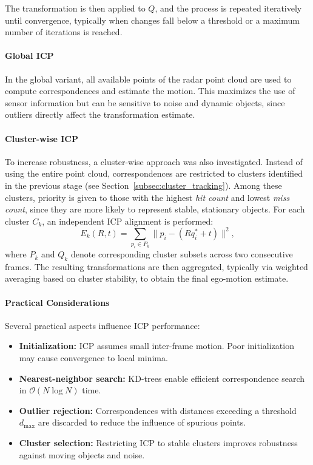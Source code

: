 The transformation is then applied to $Q$, and the process is repeated iteratively until convergence, typically when changes fall below a threshold or a maximum number of iterations is reached.

\paragraph{Global ICP}
In the global variant, all available points of the radar point cloud are used to compute correspondences and estimate the motion. 
This maximizes the use of sensor information but can be sensitive to noise and dynamic objects, since outliers directly affect the transformation estimate.

\paragraph{Cluster-wise ICP}
To increase robustness, a cluster-wise approach was also investigated. 
Instead of using the entire point cloud, correspondences are restricted to clusters identified in the previous stage (see Section~\ref{subsec:cluster_tracking}). 
Among these clusters, priority is given to those with the highest \emph{hit count} and lowest \emph{miss count}, since they are more likely to represent stable, stationary objects. 
For each cluster $C_k$, an independent ICP alignment is performed:
\begin{equation}
    E_k(R,t) = \sum_{p_i \in P_k} \lVert p_i - (R q^*_i + t) \rVert^2,
\end{equation}
where $P_k$ and $Q_k$ denote corresponding cluster subsets across two consecutive frames.
The resulting transformations are then aggregated, typically via weighted averaging based on cluster stability, to obtain the final ego-motion estimate.

\paragraph{Practical Considerations}
Several practical aspects influence ICP performance:
\begin{itemize}
    \item \textbf{Initialization:} ICP assumes small inter-frame motion. Poor initialization may cause convergence to local minima.
    \item \textbf{Nearest-neighbor search:} KD-trees enable efficient correspondence search in $\mathcal{O}(N \log N)$ time.
    \item \textbf{Outlier rejection:} Correspondences with distances exceeding a threshold $d_{\max}$ are discarded to reduce the influence of spurious points.
    \item \textbf{Cluster selection:} Restricting ICP to stable clusters improves robustness against moving objects and noise.
\end{itemize}
